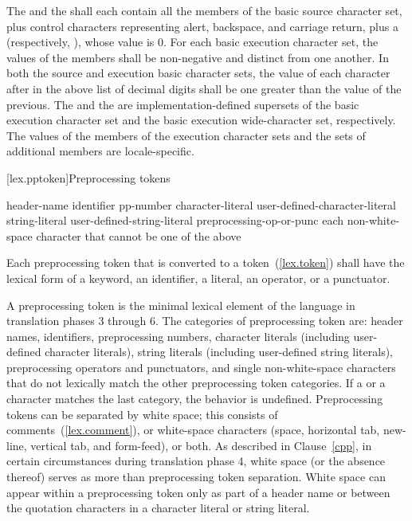 \pnum
The  and the  shall each contain all the members of the
basic source character set, plus control characters representing alert,
backspace, and carriage return, plus a 
(respectively, ), whose value is 0.
For each basic execution character set, the values of the
members shall be non-negative and distinct from one another. In both the
source and execution basic character sets, the value of each character
after  in the above list of decimal digits shall be one greater
than the value of the previous. The 
and the  are
implementation-defined
supersets of the
basic execution character set and the basic execution wide-character
set, respectively. The values of the members of the execution character sets
and the sets of additional members
are locale-specific.%

[lex.pptoken]{Preprocessing tokens}

\begin{bnf}
%
\br
    header-name\br
    identifier\br
    pp-number\br
    character-literal\br
    user-defined-character-literal\br
    string-literal\br
    user-defined-string-literal\br
    preprocessing-op-or-punc\br
    \textnormal{each non-white-space character that cannot be one of the above}
\end{bnf}

\pnum
Each preprocessing token that is converted to a token~(\ref{lex.token})
shall have the lexical form of a keyword, an identifier, a literal, an
operator, or a punctuator.

\pnum
A preprocessing token is the minimal lexical element of the language in translation
phases 3 through 6. The categories of preprocessing token are: header names,
identifiers, preprocessing numbers, character literals (including user-defined character
literals), string literals (including user-defined string literals), preprocessing
operators and punctuators, and single non-white-space characters that do not lexically
match the other preprocessing token categories. If a  or a  character
matches the last category, the behavior is undefined. Preprocessing tokens can be
separated by
%
white space;
%
this consists of comments~(\ref{lex.comment}), or white-space
characters (space, horizontal tab, new-line, vertical tab, and
form-feed), or both. As described in Clause~\ref{cpp}, in certain
circumstances during translation phase 4, white space (or the absence
thereof) serves as more than preprocessing token separation. White space
can appear within a preprocessing token only as part of a header name or
between the quotation characters in a character literal or string
literal.

